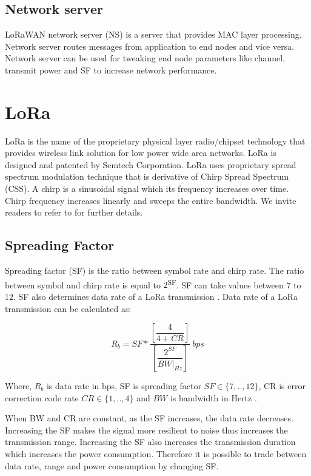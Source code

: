 \documentclass[conference]{IEEEtran}
\begin{document}
\subsection{Network server}
\par LoRaWAN network server (NS) is a server that provides MAC layer processing. Network server routes messages from application to end nodes and vice versa. Network server can be used for tweaking end node parameters like channel, transmit power and SF to increase network performance.


\section{LoRa}
\par LoRa is the name of the proprietary physical layer radio/chipset technology that provides wireless link solution for low power wide area networks. LoRa is designed and patented by Semtech Corporation. LoRa uses proprietary spread spectrum modulation technique that is derivative of Chirp Spread Spectrum (CSS). A chirp is a sinusoidal signal which its frequency increases over time. Chirp frequency increases linearly and sweeps the entire bandwidth. We invite readers to refer to \cite{AN1200.22} for further details.

\subsection{Spreading Factor}
\par Spreading factor (SF) is the ratio between symbol rate and chirp rate. The ratio between symbol and chirp rate is equal to $2$\textsuperscript{SF}. SF can take values between 7 to 12. SF also determines data rate of a LoRa transmission \cite{AN1200.22}. Data rate of a LoRa transmission can be calculated as:

\begin{equation} \label{eq:bit_rate_sf}
R_{b} = SF * \dfrac{\left[ \dfrac{4}{4+CR} \right] }{ \left[ \dfrac{2^{SF}}{BW|_{Hz}} \right]} \ bps
\end{equation}

Where, $R_{b}$ is data rate in bps, SF is spreading factor $SF \in \{7,..,12\}$, CR is error correction code rate $CR \in \{1,..,4\}$ and $BW$ is bandwidth in Hertz \cite{AN1200.22}.

\par When BW and CR are constant, as the SF increases, the data rate decreases. Increasing the SF makes the signal more resilient to noise thus increases the transmission range. Increasing the SF also increases the transmission duration which increases the power consumption. Therefore it is possible to trade between data rate, range and power consumption by changing SF.
\end{document}
